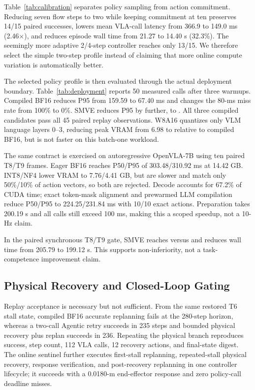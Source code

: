 \documentclass[runningheads]{waica}
\begin{document}
Table~\ref{tab:calibration} separates policy sampling from action commitment.
Reducing seven flow steps to two while keeping commitment at ten preserves
14/15 paired successes, lowers mean VLA-call latency from 366.9 to 149.0 ms
(2.46$\times$), and reduces episode wall time from 21.27 to 14.40 s (32.3\%).
The seemingly more adaptive 2/4-step controller reaches only 13/15. We
therefore select the simple two-step profile instead of claiming that more
online compute variation is automatically better.



The selected policy profile is then evaluated through the actual deployment
boundary. Table~\ref{tab:deployment} reports 50 measured calls after three
warmups. Compiled BF16 reduces P95 from 159.59 to 67.40 ms and changes the
80-ms miss rate from 100\% to 0\%. SMVE reduces P95 by
\CarveSmveRuntimeReduction{} further, to \CarveSmvePninetyfive{}. All three
compiled candidates pass all 45 paired replay observations. W8A16 quantizes only VLM language layers 0--3, reducing
peak VRAM from 6.98 to \CarveWMemory{} relative to compiled BF16, but is not
faster on this batch-one workload.



The same contract is exercised on autoregressive OpenVLA-7B using ten paired
T8/T9 frames. Eager BF16 reaches P50/P95 of 303.48/310.92 ms at 14.42 GB.
INT8/NF4 lower VRAM to 7.76/4.41 GB, but are slower and match only 50\%/10\%
of action vectors, so both are rejected. Decode accounts for 67.2\% of CUDA
time; exact token-mask alignment and prewarmed LLM compilation reduce P50/P95
to 224.25/231.84 ms with 10/10 exact actions. Preparation takes 200.19 s and
all calls still exceed 100 ms, making this a scoped speedup, not a 10-Hz claim.

In the paired synchronous T8/T9 gate, SMVE reaches \CarveSmveSuccess{} versus
\CarveSyncEightSuccess{} and reduces wall time from 205.79 to 199.12 s. This
supports non-inferiority, not a task-competence improvement claim.

\subsection{Physical Recovery and Closed-Loop Gating}

Replay acceptance is necessary but not sufficient. From the same restored T6
stall state, compiled BF16 accurate replanning fails at the 280-step horizon,
whereas a two-call Agentic retry succeeds in 235 steps and bounded physical
recovery plus replan succeeds in 236. Repeating the physical branch reproduces
success, step count, 112 VLA calls, 12 recovery actions, and final-state digest.
The online sentinel further executes first-stall replanning, repeated-stall
physical recovery, response verification, and post-recovery replanning in one
controller lifecycle; it succeeds with a 0.0180-m end-effector response and
zero policy-call deadline misses.
\end{document}
